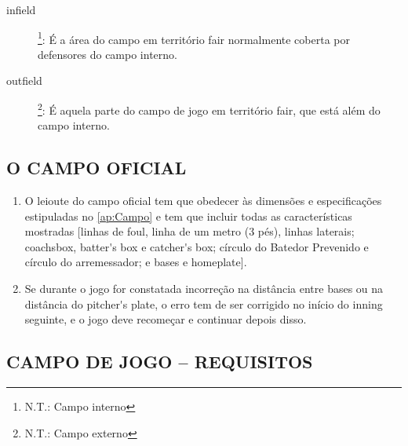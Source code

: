 \begin{description}
	
	\item[ \Gls{infield}]\footnote{N.T.: Campo interno}:	\'E a \'area do campo em territ\'orio \gls{fair} normalmente coberta por defensores do campo interno. 
	
	\item[\Gls{outfield}]\footnote{N.T.: Campo externo}: \'E aquela parte do campo de jogo em territ\'orio \gls{fair}, que est\'a al\'em do campo interno. 
	

	\end{description}

\subsection{O CAMPO OFICIAL} 

\begin{enumerate}[label=\alph*)]
	\item O leioute do campo oficial tem que obedecer \`as dimens\~oes e especifica\c{c}\~oes 
	estipuladas no \autoref{ap:Campo} e tem que incluir todas as caracter\'isticas mostradas [linhas de \gls{foul}, linha de um metro (3 p\'es), linhas laterais; \gls{coachsbox}, \gls{batter's box} e \gls{catcher's box}; c\'irculo do Batedor Prevenido e c\'irculo do arremessador; e bases e \gls{homeplate}]. 
	
	\item  Se durante o jogo for constatada incorre\c{c}\~ao na dist\^ancia entre bases ou na dist\^ancia do \gls{pitcher's plate}, o erro tem de ser corrigido no in\'icio do \gls{inning} seguinte, e o jogo deve recome\c{c}ar e continuar depois disso. 
\end{enumerate}

\subsection{CAMPO DE JOGO -- REQUISITOS }

